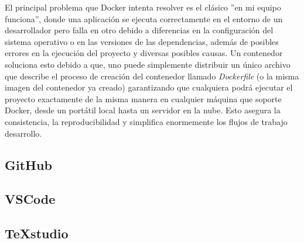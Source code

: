 El principal problema que Docker intenta resolver es el clásico ''en mi equipo funciona'', donde una aplicación se ejecuta correctamente en el entorno de un desarrollador pero falla en otro debido a diferencias en la configuración del sistema operativo o en las versiones de las dependencias, además de posibles errores en la ejecución del proyecto y diversas posibles causas. Un contenedor soluciona esto debido a que, uno puede simplemente distribuir un único archivo que describe el proceso de creación del contenedor llamado \textit{Dockerfile} (o la misma imagen del contenedor ya creado) garantizando que cualquiera podrá ejecutar el proyecto exactamente de la misma manera en cualquier máquina que soporte Docker, desde un portátil local hasta un servidor en la nube. Esto asegura la consistencia, la reproducibilidad y simplifica enormemente los flujos de trabajo desarrollo.


\subsection{GitHub}

\subsection{VSCode}

\subsection{TeXstudio}
